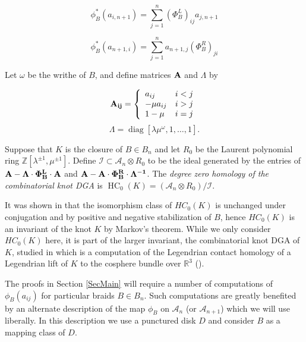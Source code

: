 \documentclass[11pt]{amsart}
\def\Z{{\mathbb Z}}
\def\R{{\mathbb R}}
\def\A{{\mathcal A}}
\newcommand\diag{\operatorname{diag}}
\newenvironment{definition}[1][Definition]{\begin{trivlist}
\item[\hskip \labelsep {\bfseries #1}]}{\end{trivlist}}
\begin{document}
  $$\phi_B^*(a_{i,n+1}) = \sum_{j=1}^n(\Phi_B^L)_{ij}a_{j,n+1}$$

  $$\phi_B^*(a_{n+1,i}) = \sum_{j=1}^na_{n+1,j}(\Phi_B^R)_{ji}$$

  Let $\omega$ be the writhe of $B$, and define matrices $\bf{A}$ and $\Lambda$ by

  \begin{equation}
  \bf{A}_{ij} = 
  \left\{
       \begin{array}{lr}
        a_{ij} & i<j\\
        -\mu a_{ij} & i>j\\
        1-\mu & i = j\\
       \end{array}
  \right.
  \label{def:Amatrix}
  \end{equation}
  \begin{equation}
  \Lambda = \diag[\lambda\mu^\omega,1,\ldots,1].
  \label{defn:Lambda}
  \end{equation}

  \begin{definition}
  Suppose that $K$ is the closure of $B\in B_n$ and let $R_0$ be the Laurent polynomial ring $\Z[\lambda^{\pm 1},\mu^{\pm 1}]$. Define $\mathcal{I}\subset \A_n\otimes R_0$ to be the ideal generated by the entries of $\bf{A} - \Lambda\cdot\Phi_B^L\cdot \bf{A}$ and $\bf{A} - \bf{A}\cdot\Phi_B^R\cdot\Lambda^{-1}$.  The \emph{degree zero homology of the combinatorial knot DGA} is $\operatorname{HC}_0(K) = (\A_n\otimes R_0)/\mathcal{I}$.
  \label{defn:HC_0}
  \end{definition}
  
  It was shown in \cite{Ng08} that the isomorphism class of $HC_0(K)$ is unchanged under conjugation and by positive and negative stabilization of $B$, hence $HC_0(K)$ is an invariant of the knot $K$ by Markov's theorem. While we only consider $HC_0(K)$ here, it is part of the larger invariant, the combinatorial knot DGA of $K$, studied in \cite{Ng08} which is a computation of the Legendrian contact homology of a Legendrian lift of $K$ to the cosphere bundle over $\R^3$ (\cite{EENS12}).

  The proofs in Section \ref{SecMain} will require a number of computations of $\phi_B(a_{ij})$ for particular braids $B\in B_n$. Such computations are greatly benefited by an alternate description of the map $\phi_B$ on $\A_n$ (or $\A_{n+1}$) which we will use liberally. In this description we use a punctured disk $D$ and consider $B$ as a mapping class of $D$.
\end{document}
